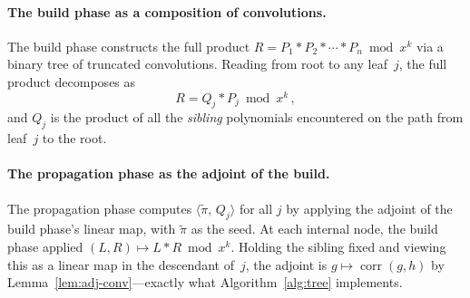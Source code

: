 \documentclass[11pt]{article}
\DeclareMathOperator{\corr}{corr}
\newcommand{\ip}[2]{\langle #1,\, #2 \rangle}
\begin{document}
\paragraph{The build phase as a composition of convolutions.}
The build phase constructs the full product
$R = P_1 * P_2 * \cdots * P_n \bmod x^k$
via a binary tree of truncated convolutions. Reading from root to any
leaf~$j$, the full product decomposes as
\begin{equation}\label{eq:product-decomp}
  R = Q_j * P_j \bmod x^k\,,
\end{equation}
and $Q_j$ is the product of all the \emph{sibling} polynomials encountered
on the path from leaf~$j$ to the root.

\paragraph{The propagation phase as the adjoint of the build.}
The propagation phase computes $\ip{\tilde\pi}{Q_j}$ for all $j$ by
applying the adjoint of the build phase's linear map, with $\tilde\pi$
as the seed. At each internal node, the build phase applied
$(L, R) \mapsto L * R \bmod x^k$. Holding the sibling fixed and viewing
this as a linear map in the descendant of~$j$, the adjoint is
$g \mapsto \corr(g, h)$ by Lemma~\ref{lem:adj-conv}---exactly what
Algorithm~\ref{alg:tree} implements.
\end{document}
